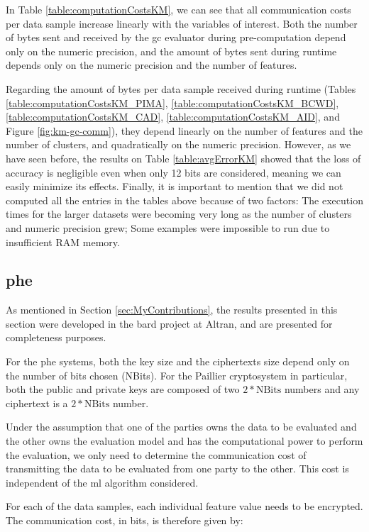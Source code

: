 In Table \ref{table:computationCostsKM}, we can see that all communication costs per data sample increase linearly with the variables of interest. Both the number of bytes sent and received by the \ac{gc} evaluator during pre-computation depend only on the numeric precision, and the amount of bytes sent during runtime depends only on the numeric precision and the number of features.

Regarding the amount of bytes per data sample received during runtime (Tables \ref{table:computationCostsKM_PIMA}, \ref{table:computationCostsKM_BCWD}, \ref{table:computationCostsKM_CAD}, \ref{table:computationCostsKM_AID}, and Figure \ref{fig:km-gc-comm}), they depend linearly on the number of features and the number of clusters, and quadratically on the numeric precision. However, as we have seen before, the results on Table \ref{table:avgErrorKM} showed that the loss of accuracy is negligible even when only 12 bits are considered, meaning we can easily minimize its effects. Finally, it is important to mention that we did not computed all the entries in the tables above because of two factors: The execution times for the larger datasets were becoming very long as the number of clusters and numeric precision grew; Some examples were impossible to run due to insufficient RAM memory.


\subsection{\acl{phe}}
\label{ssec:comm_phe}

As mentioned in Section \ref{sec:MyContributions}, the results presented in this section were developed in the \ac{bard} project at Altran, and are presented for completeness purposes.

For the \ac{phe} systems, both the key size and the ciphertexts size depend only on the number of bits chosen (NBits). For the Paillier cryptosystem in particular, both the public and private keys are composed of two $2*\text{NBits}$ numbers and any ciphertext is a $2*\text{NBits}$ number.

Under the assumption that one of the parties owns the data to be evaluated and the other owns the evaluation model and has the computational power to perform the evaluation, we only need to determine the communication cost of transmitting the data to be evaluated from one party to the other. This cost is independent of the \ac{ml} algorithm considered.

For each of the data samples, each individual feature value needs to be encrypted. The communication cost, in bits, is therefore given by:

